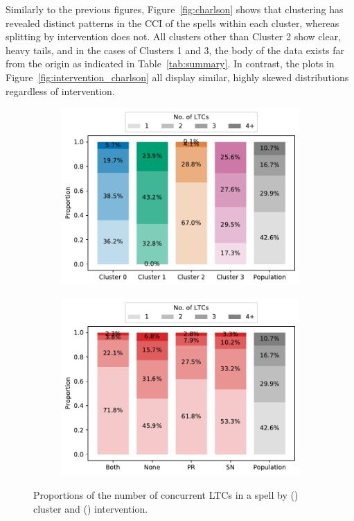Similarly to the previous figures, Figure~\ref{fig:charlson} shows that
clustering has revealed distinct patterns in the CCI of the spells within each
cluster, whereas splitting by intervention does not. All clusters other than
Cluster 2 show clear, heavy tails, and in the cases of Clusters 1 and 3, the
body of the data exists far from the origin as indicated in
Table~\ref{tab:summary}. In contrast, the plots in
Figure~\ref{fig:intervention_charlson} all display similar, highly skewed
distributions regardless of intervention.

\begin{figure}
    \centering
    \begin{subfigure}{.5\imgwidth}
        \includegraphics[width=\linewidth]{cluster_ltcs}
        \caption{}\label{fig:cluster_ltcs}
    \end{subfigure}\hfill%
    \begin{subfigure}{.5\imgwidth}
        \includegraphics[width=\linewidth]{intervention_ltcs}
        \caption{}\label{fig:intervention_ltcs}
    \end{subfigure}
    \caption{%
        Proportions of the number of concurrent LTCs in a spell by
        () cluster and ()
        intervention.
    }\label{fig:ltcs}
\end{figure}

